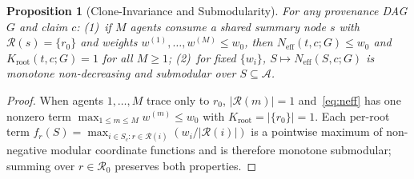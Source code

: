 \documentclass[conference]{IEEEtran}
\newtheorem{proposition}{Proposition}
\theoremstyle{definition}
\theoremstyle{remark}
\newcommand{\Neff}{N_{\mathrm{eff}}}
\begin{document}
\begin{proposition}[Clone-Invariance and Submodularity]\label{prop:clone}
For any provenance DAG $G$ and claim $c$: (1)~if $M$ agents consume a shared summary node $s$ with $\mathcal{R}(s) = \{r_0\}$ and weights $w^{(1)}, \dots, w^{(M)} \le w_0$, then $\Neff(t, c; G) \le w_0$ and $K_{\mathrm{root}}(t, c; G) = 1$ for all $M \ge 1$; (2)~for fixed $\{w_i\}$, $S \mapsto \Neff(S, c; G)$ is monotone non-decreasing and submodular over $S \subseteq \mathcal{A}$.
\end{proposition}

\begin{proof}
When agents $1, \dots, M$ trace only to $r_0$, $|\mathcal{R}(m)| = 1$ and~\eqref{eq:neff} has one nonzero term $\max_{1 \le m \le M} w^{(m)} \le w_0$ with $K_{\mathrm{root}} = |\{r_0\}| = 1$. Each per-root term $f_r(S) = \max_{i \in S_c: r \in \mathcal{R}(i)} (w_i / |\mathcal{R}(i)|)$ is a pointwise maximum of non-negative modular coordinate functions and is therefore monotone submodular; summing over $r \in \mathcal{R}_0$ preserves both properties.
\end{proof}
\end{document}
